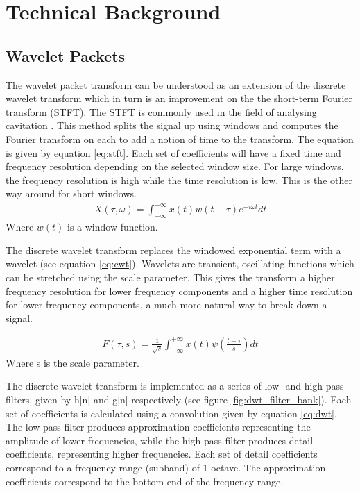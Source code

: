 \documentclass[reprint,NumberedRefs]{JASA}
\begin{document}
\section{Technical Background}
\subsection{Wavelet Packets}
\label{sec:Wavelet_Packets}
The wavelet packet transform can be understood as an extension of the discrete wavelet transform which in turn is an improvement on the the short-term Fourier transform (STFT). The STFT is commonly used in the field of analysing cavitation \cite{Teh2014}. This method splits the signal up using windows and computes the Fourier transform on each to add a notion of time to the transform. The equation is given by equation \ref{eq:stft}. Each set of coefficients will have a  fixed time and frequency resolution depending on the selected window size. For large windows, the frequency resolution is high while the time resolution is low. This is the other way around  for short windows.
\begin{align}
X(\tau,\omega)=\int_{-\infty}^{+\infty}{x(t)w(t-\tau)e^{-i\omega t}dt} \label{eq:stft}
\end{align}
Where $w(t)$ is a window function.

The discrete wavelet transform replaces the windowed exponential term with a wavelet (see equation \ref{eq:cwt}). Wavelets are transient, oscillating functions which can be stretched using the scale parameter. This gives the transform a higher frequency resolution for lower frequency components and a higher time resolution for lower frequency components, a much more natural way to break down a signal.

\begin{align}
F(\tau,s)=\frac{1}{\sqrt{s}}\int_{-\infty}^{+\infty}{x(t)\psi\left(\frac{t-\tau}{s}\right)dt} \label{eq:cwt}
\end{align}
Where s is the scale parameter.

The discrete wavelet transform is implemented as a series of low- and high-pass filters, given by h[n] and g[n] respectively (see figure \ref{fig:dwt_filter_bank}). Each set of coefficients is calculated using a convolution given by equation \ref{eq:dwt}. The low-pass filter produces approximation coefficients representing the amplitude of lower frequencies, while the high-pass filter produces detail coefficients, representing higher frequencies. Each set of detail coefficients correspond to a frequency range (subband) of 1 octave. The approximation coefficients correspond to the bottom end of the frequency range.
\end{document}
